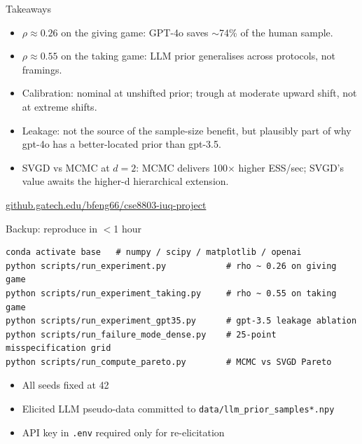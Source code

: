 \documentclass[10pt, aspectratio=169]{beamer}
\begin{document}
\begin{frame}{Takeaways}
\begin{itemize}\setlength{\itemsep}{6pt}
  \item $\rho \approx 0.26$ on the giving game: GPT-4o saves $\sim$74\% of the human sample.
  \item $\rho \approx 0.55$ on the taking game: LLM prior generalises across protocols, not framings.
  \item Calibration: nominal at unshifted prior; trough at moderate upward shift, not at extreme shifts.
  \item Leakage: not the source of the sample-size benefit, but plausibly part of why gpt-4o has a better-located prior than gpt-3.5.
  \item SVGD vs MCMC at $d=2$: MCMC delivers 100$\times$ higher ESS/sec; SVGD's value awaits the higher-d hierarchical extension.
\end{itemize}
\vspace{0.6em}
\centering\small
\href{https://github.gatech.edu/bfeng66/cse8803-iuq-project}{github.gatech.edu/bfeng66/cse8803-iuq-project}
\end{frame}

\begin{frame}[fragile]{Backup: reproduce in $<$1 hour}
\begin{verbatim}
conda activate base   # numpy / scipy / matplotlib / openai
python scripts/run_experiment.py            # rho ~ 0.26 on giving game
python scripts/run_experiment_taking.py     # rho ~ 0.55 on taking game
python scripts/run_experiment_gpt35.py      # gpt-3.5 leakage ablation
python scripts/run_failure_mode_dense.py    # 25-point misspecification grid
python scripts/run_compute_pareto.py        # MCMC vs SVGD Pareto
\end{verbatim}
\begin{itemize}\setlength{\itemsep}{2pt}
  \item All seeds fixed at 42
  \item Elicited LLM pseudo-data committed to \texttt{data/llm\_prior\_samples*.npy}
  \item API key in \texttt{.env} required only for re-elicitation
\end{itemize}
\end{frame}
\end{document}

